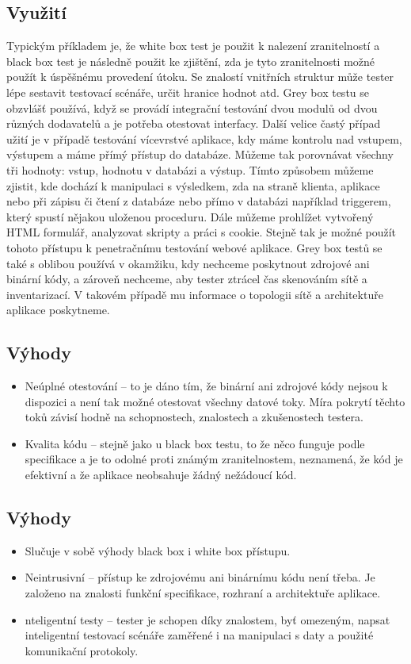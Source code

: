\documentclass{article}
\begin{document}
\begin{large}
\subsection{Využití}
Typickým příkladem je, že white box test je použit k nalezení zranitelností a black box test je následně použit ke zjištění, zda je tyto zranitelnosti možné použít k úspěšnému provedení útoku. Se znalostí vnitřních struktur může tester lépe sestavit testovací scénáře, určit hranice hodnot atd. Grey box testu se obzvlášť používá, když se provádí integrační testování dvou modulů od dvou různých dodavatelů a je potřeba otestovat interfacy. Další velice častý případ užití je v případě testování vícevrstvé aplikace, kdy máme kontrolu nad vstupem, výstupem a máme přímý přístup do databáze. Můžeme tak porovnávat všechny tři hodnoty: vstup, hodnotu v databázi a výstup. Tímto způsobem můžeme zjistit, kde dochází k manipulaci s výsledkem, zda na straně klienta, aplikace nebo při zápisu či čtení z databáze nebo přímo v databázi například triggerem, který spustí nějakou uloženou proceduru. Dále můžeme prohlížet vytvořený HTML formulář, analyzovat skripty a práci s cookie. Stejně tak je možné použít tohoto přístupu k penetračnímu testování webové aplikace. Grey box testů se také s oblibou používá v okamžiku, kdy nechceme poskytnout zdrojové ani binární kódy, a zároveň nechceme, aby tester ztrácel čas skenováním sítě a inventarizací. V takovém případě mu informace o topologii sítě a architektuře aplikace poskytneme.
\subsection{Výhody}
\begin{itemize}
    \item Neúplné otestování – to je dáno tím, že binární ani zdrojové kódy nejsou k dispozici a není tak možné otestovat všechny datové toky.  Míra pokrytí těchto toků závisí hodně na schopnostech, znalostech a zkušenostech testera.
    \item Kvalita kódu – stejně jako u black box testu, to že něco funguje podle specifikace a je to odolné proti známým zranitelnostem, neznamená, že kód je efektivní a že aplikace neobsahuje žádný nežádoucí kód.

\end{itemize}
\subsection{Výhody}
\begin{itemize}
    \item Slučuje v sobě výhody black box i white box přístupu.
    \item Neintrusivní – přístup ke zdrojovému ani binárnímu kódu není třeba. Je založeno na znalosti funkční specifikace, rozhraní a architektuře aplikace.
    \item nteligentní testy – tester je schopen díky znalostem, byť omezeným, napsat inteligentní testovací scénáře zaměřené i na manipulaci s daty a použité komunikační protokoly.
\end{itemize}

\end{large}
\end{document}
